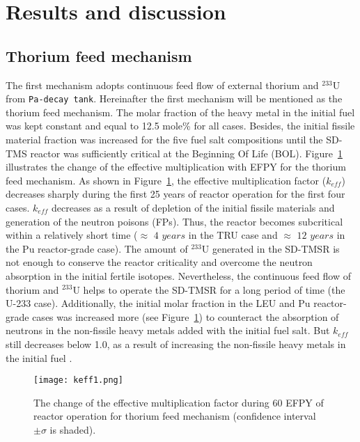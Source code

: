 \section{Results and discussion}

\subsection{Thorium feed mechanism}

The first mechanism adopts continuous feed flow of external thorium and $^{233}$U from \texttt{Pa-decay tank}. Hereinafter the first mechanism will be mentioned as the thorium feed mechanism. The molar fraction of the heavy metal in the initial fuel was kept constant and equal to 12.5 mole\% for all cases. Besides, the initial fissile material fraction was increased for the five fuel salt compositions until the SD-TMS reactor was sufficiently critical at the Beginning Of Life (BOL). 
Figure~\ref{fig:keff1} illustrates the change of the effective multiplication with \gls{EFPY} for the thorium feed mechanism. As shown in Figure~\ref{fig:keff1}, the effective multiplication factor ($k_{eff}$) decreases sharply during the first 25 years of reactor operation for the first four cases. $k_{eff}$ decreases as a result of depletion of the initial fissile materials and generation of the neutron poisons (FPs). Thus, the reactor becomes subcritical within a relatively short time ($\approx$ $4$ $years$ in the \gls{TRU} case and $\approx$ $12$ $years$ in the Pu reactor-grade case). The amount of $^{233}$U generated in the \gls{SD-TMSR} is not enough to conserve the reactor criticality and overcome the neutron absorption in the initial fertile isotopes. Nevertheless, the continuous feed flow of thorium and $^{233}$U helps to operate the \gls{SD-TMSR} for a long period of time (the U-233 case). Additionally, the initial molar fraction in the LEU and Pu reactor-grade cases was increased more (see Figure~\ref{fig:keff1}) to counteract the absorption of neutrons in the non-fissile heavy metals added with the initial fuel salt. But $k_{eff}$ still decreases below 1.0, as a result of increasing the non-fissile heavy metals in the initial fuel \cite{betzler2016modeling}.

\begin{figure}
	\centering
	\texttt{[image: keff1.png]}
	\caption{The change of the effective multiplication factor during 60 \gls{EFPY} of reactor operation for thorium feed mechanism (confidence interval $\pm\sigma$ is shaded).} 
	\label{fig:keff1}
\end{figure}

